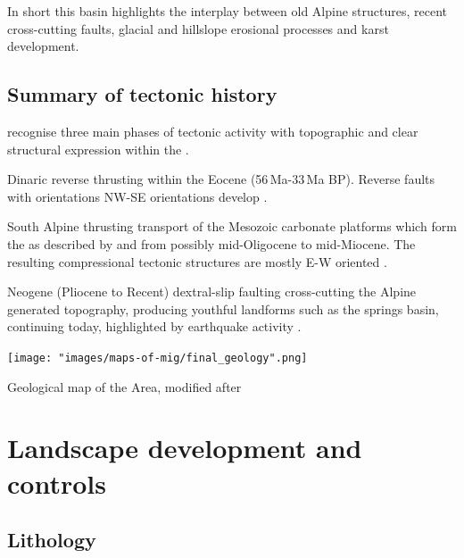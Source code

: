 In short this basin highlights the interplay between old Alpine structures, recent cross-cutting faults, glacial and hillslope erosional processes and karst development.

\subsection{Summary of tectonic history}
\label{par:summary of tectonic}
\citet{kastelic2008neo} recognise three main phases of tectonic activity with topographic and clear structural expression within the .

\begin{citemize}
\item Dinaric reverse thrusting within the Eocene (56\,Ma-33\,Ma BP). Reverse faults with orientations NW-SE orientations develop  \citep{castellarin2000neo}.
\item South Alpine thrusting transport of the Mesozoic carbonate platforms which form the  as described by \citet{placer1998contribution} and \citet{buser1986tolmavc} from possibly mid-Oligocene to mid-Miocene. The resulting compressional tectonic structures are mostly E-W oriented \citep{castellarin2000neo}.
\item Neogene (Pliocene to Recent) dextral-slip faulting cross-cutting the Alpine generated topography, producing youthful landforms such as the  springs basin, continuing today, highlighted by earthquake activity \citep{vsmuc2009tectonic,cunningham2006application}.
\end{citemize}

 \begin{pagemap}
 \checkoddpage \ifoddpage \forcerectofloat \else \forceversofloat \fi
\centering
  \texttt{[image: "images/maps-of-mig/final\_geology".png]}
  
  \caption{Geological map of the  Area, modified after \citet{buser1986tolmavc}}
  \label{map:mapofgeology}
 \end{pagemap}

\section{Landscape development and controls}
\subsection{Lithology}
\label{par:lithology}

